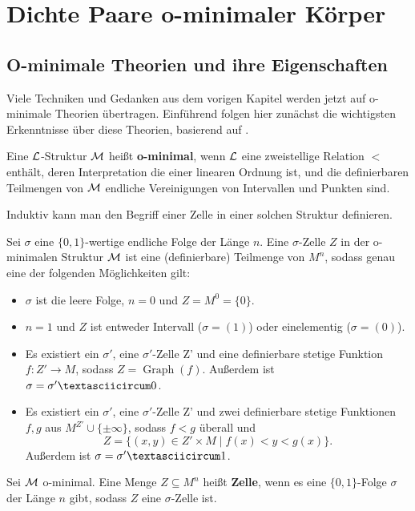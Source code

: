 \chapter{Dichte Paare o-minimaler Körper}
\section{O-minimale Theorien und ihre Eigenschaften}

Viele Techniken und Gedanken aus dem vorigen Kapitel werden jetzt auf o-minimale Theorien übertragen. Einführend folgen hier zunächst die wichtigsten Erkenntnisse über diese Theorien, basierend auf \cite{vdDZellzerlegung}.

\begin{definition}
	Eine $\mathcal{L}$-Struktur $\mathcal{M}$ heißt \textbf{o-minimal}, wenn $\mathcal{L}$ eine zweistellige Relation $<$ enthält, deren Interpretation die einer linearen Ordnung ist, und die definierbaren Teilmengen von $\mathcal{M}$ endliche Vereinigungen von Intervallen und Punkten sind.
\end{definition}

Induktiv kann man den Begriff einer Zelle in einer solchen Struktur definieren.
\begin{definition}
	Sei $\sigma$ eine $\{0,1\}$-wertige endliche Folge der Länge $n$. Eine $\sigma$-Zelle $Z$ in der o-minimalen Struktur $\mathcal{M}$ ist eine (definierbare) Teilmenge von $M^n$, sodass genau eine der folgenden Möglichkeiten gilt:
	\begin{itemize}
		\item $\sigma$ ist die leere Folge, $n=0$ und $Z=M^0=\{0\}$.
		\item $n=1$ und $Z$ ist entweder Intervall ($\sigma=(1)$) oder einelementig ($\sigma=(0)$).
		\item Es existiert ein $\sigma'$, eine $\sigma'$-Zelle Z' und eine definierbare stetige Funktion\linebreak$f:Z'\rightarrow M$, sodass $Z=\operatorname{Graph}(f)$. Außerdem ist $\sigma=\sigma'\textasciicircum0$.
		\item Es existiert ein $\sigma'$, eine $\sigma'$-Zelle Z' und zwei definierbare stetige Funktionen $f,g$ aus $M^{Z'}\cup\{\pm\infty\}$, sodass $f<g$ überall und $$Z=\{(x,y)\in Z'\times M\mid f(x)<y<g(x)\}.$$ Außerdem ist $\sigma=\sigma'\textasciicircum1$.
	\end{itemize}
\end{definition}
\begin{definition}
	Sei $\mathcal{M}$ o-minimal. Eine Menge $Z\subseteq M^n$ heißt \textbf{Zelle}, wenn es eine $\{0,1\}$-Folge $\sigma$ der Länge $n$ gibt, sodass $Z$ eine $\sigma$-Zelle ist.
\end{definition}

